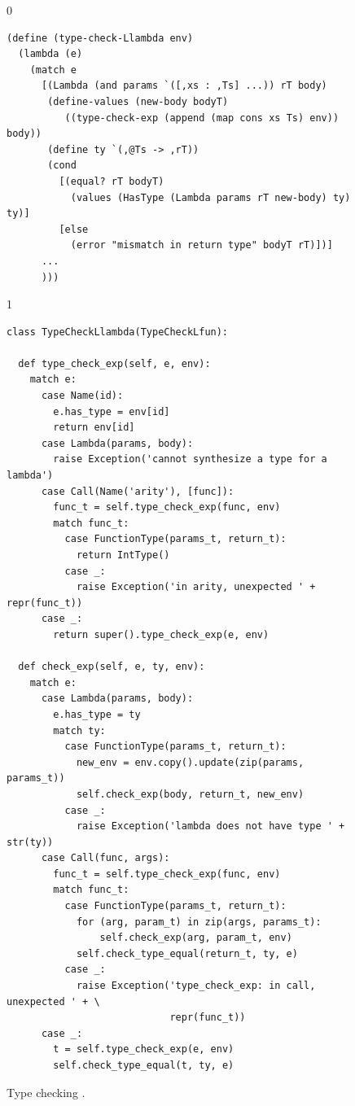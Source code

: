 \documentclass[7x10]{TimesAPriori_MIT}%
\def\racketEd{0}
\def\pythonEd{1}
\def\edition{0}
\newcommand{\python}[1]{{\if\edition\pythonEd #1\fi}}
\numberwithin{theorem}{chapter}
\numberwithin{definition}{chapter}
\numberwithin{equation}{chapter}
\begin{document}
\begin{figure}[tbp]
  \begin{tcolorbox}[colback=white]
    {\if\edition\racketEd 
\begin{lstlisting}
(define (type-check-Llambda env)
  (lambda (e)
    (match e
      [(Lambda (and params `([,xs : ,Ts] ...)) rT body)
       (define-values (new-body bodyT) 
          ((type-check-exp (append (map cons xs Ts) env)) body))
       (define ty `(,@Ts -> ,rT))
       (cond
         [(equal? rT bodyT)
           (values (HasType (Lambda params rT new-body) ty) ty)]
         [else
           (error "mismatch in return type" bodyT rT)])]
      ...
      )))
\end{lstlisting}
\fi}
{\if\edition\pythonEd 
\begin{lstlisting}
class TypeCheckLlambda(TypeCheckLfun):

  def type_check_exp(self, e, env):
    match e:
      case Name(id):
        e.has_type = env[id]
        return env[id]
      case Lambda(params, body):
        raise Exception('cannot synthesize a type for a lambda')
      case Call(Name('arity'), [func]):
        func_t = self.type_check_exp(func, env)
        match func_t:
          case FunctionType(params_t, return_t):
            return IntType()
          case _:
            raise Exception('in arity, unexpected ' + repr(func_t))
      case _:
        return super().type_check_exp(e, env)
    
  def check_exp(self, e, ty, env):
    match e:
      case Lambda(params, body):
        e.has_type = ty
        match ty:
          case FunctionType(params_t, return_t):
            new_env = env.copy().update(zip(params, params_t))
            self.check_exp(body, return_t, new_env)
          case _:
            raise Exception('lambda does not have type ' + str(ty))
      case Call(func, args):
        func_t = self.type_check_exp(func, env)
        match func_t:
          case FunctionType(params_t, return_t):
            for (arg, param_t) in zip(args, params_t):
                self.check_exp(arg, param_t, env)
            self.check_type_equal(return_t, ty, e)
          case _:
            raise Exception('type_check_exp: in call, unexpected ' + \
                            repr(func_t))
      case _:
        t = self.type_check_exp(e, env)
        self.check_type_equal(t, ty, e)
\end{lstlisting}
\fi}
  \end{tcolorbox}

  \caption{Type checking \LangLam{}\python{, part 1}.}
\label{fig:type-check-Llambda}
\end{figure}
\end{document}
